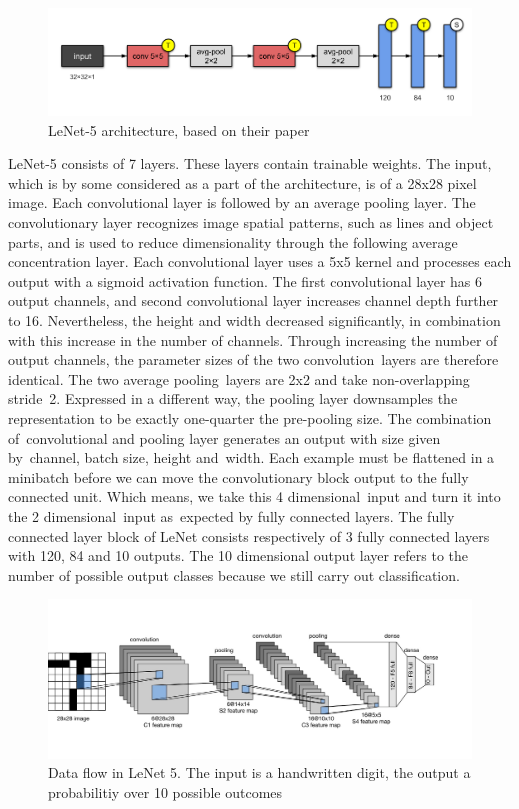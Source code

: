 \begin{figure}[H]
  \centering
  \includegraphics[scale=0.48]{images/Chapter4/lenet5.png}
  \caption{LeNet-5 architecture, based on their paper \cite{lecun1998gradient}}
  \label{lenet5}
\end{figure}
\par
LeNet-5 consists of 7 layers. These layers contain trainable weights. The input, which is by some considered as a part of the architecture, is of a 28x28 pixel image. Each convolutional layer is followed by an average pooling layer. The convolutionary layer recognizes image spatial patterns, such as lines and object parts, and is used to reduce dimensionality through the following average concentration layer. Each convolutional layer uses a 5x5 kernel and processes each output with a sigmoid activation function. The first convolutional layer has 6 output channels, and second convolutional layer increases channel depth further to 16. Nevertheless, the height and width decreased significantly, in combination with this increase in the number of channels. Through increasing the number of output channels, the parameter sizes of the two convolution layers are therefore identical. The two average pooling layers are 2x2 and take non-overlapping stride 2. Expressed in a different way, the pooling layer downsamples the representation to be exactly one-quarter the pre-pooling size. The combination of convolutional and pooling layer generates an output with size given by channel, batch size, height and width. Each example must be flattened in a minibatch before we can move the convolutionary block output to the fully connected unit. Which means, we take this 4 dimensional input and turn it into the 2 dimensional input as expected by fully connected layers. The fully connected layer block of LeNet consists respectively of 3 fully connected layers with 120, 84 and 10 outputs. The 10 dimensional output layer refers to the number of possible output classes because we still carry out classification.
\begin{figure}[H]
  \centering
  \includegraphics[scale=0.14]{images/Chapter4/lenet.jpg}
  \caption{Data flow in LeNet 5. The input is a handwritten digit, the output a probabilitiy over 10 possible outcomes}
  \label{lenet5}
\end{figure}
\par


